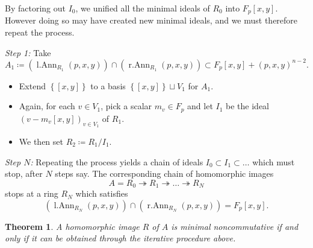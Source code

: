 \documentclass[11pt]{article}
\DeclareMathOperator{\lAnn}{l.Ann}
\DeclareMathOperator{\rAnn}{r.Ann}
\newtheorem{theorem}[corollary]{Theorem}
\theoremstyle{definition}
\begin{document}
By factoring out $I_0$, we unified all the minimal ideals of $R_0$ into $F_p[x,y]$. However doing so may have created new minimal ideals, and we must therefore repeat the process. 

\textit{Step 1:} Take
\[A_1\coloneqq\left(\lAnn_{R_1}(p,x,y)\right)\cap\left(\rAnn_{R_1}(p,x,y)\right)\subset F_p[x,y]+(p,x,y)^{n-2}.\]

\begin{itemize}[topsep=0pt]
\item[(a)] Extend $\left\lbrace [x,y]\right\rbrace$ to a basis $\left\lbrace [x,y]\right\rbrace\sqcup V_1$ for $A_1$. 

\item[(b)] Again, for each $v\in V_1$, pick a scalar $m_v\in F_p$ and let $I_1$ be the ideal $(v-m_v[x,y])_{v\in V_1}$ of $R_1$.

\item[(c)] We then set $R_2\coloneqq R_1/I_1$.
\end{itemize}

\textit{Step $N$:} Repeating the process yields a chain of ideals $I_0\subset I_1\subset\ldots$ which must stop, after $N$ steps say. The corresponding chain of homomorphic images
\[A=R_0\twoheadrightarrow R_1\twoheadrightarrow \ldots\twoheadrightarrow R_N\]
stops at a ring $R_N$ which satisfies 
\[\left(\lAnn_{R_N}(p,x,y)\right)\cap\left(\rAnn_{R_N}(p,x,y)\right)=F_p[x,y].\]

\begin{theorem}\label{ProcedureAllAndOnly}
A homomorphic image $R$ of $A$ is minimal noncommutative if and only if it can be obtained through the iterative procedure above.
\end{theorem}
\end{document}
